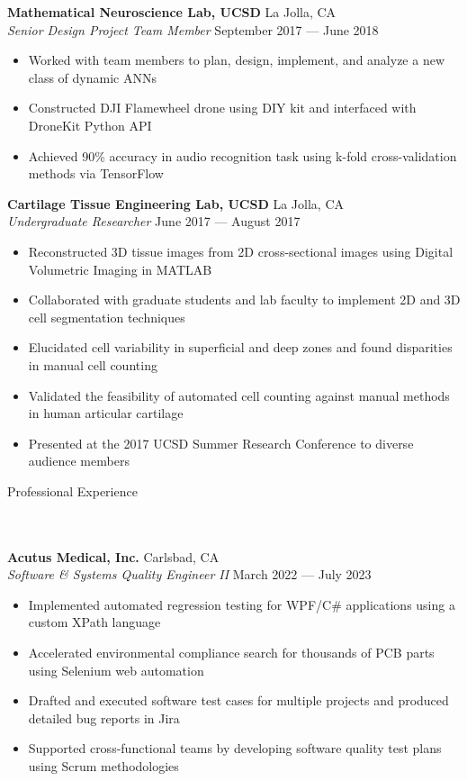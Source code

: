 \documentclass{article}
\newcommand{\lineunder} {
    \vspace*{-8pt} \\
    \hspace*{-18pt} \hrulefill \\
}
\newcommand{\header} [1] {
    {\hspace*{-18pt}\vspace*{6pt} \Large{#1} }
    \vspace*{-6pt} 
    \lineunder
}
\begin{document}
\textbf{Mathematical Neuroscience Lab, UCSD} \hfill La Jolla, CA\\
\textit{Senior Design Project Team Member} \hfill September 2017 --- June 2018\\
\vspace{-2mm}
\begin{itemize} \itemsep 0.05pt
	\item Worked with team members to plan, design, implement, and analyze a new class of dynamic ANNs
	\item Constructed DJI Flamewheel drone using DIY kit and interfaced with DroneKit Python API
	\item Achieved 90\% accuracy in audio recognition task using k-fold cross-validation methods via TensorFlow
	
\end{itemize}

\textbf{Cartilage Tissue Engineering Lab, UCSD} \hfill La Jolla, CA\\
\textit{Undergraduate Researcher} \hfill June 2017 --- August 2017\\
\vspace{-2mm}
\begin{itemize} \itemsep 0.05pt
	\item Reconstructed 3D tissue images from 2D cross-sectional images using Digital Volumetric Imaging in MATLAB
	\item Collaborated with graduate students and lab faculty to implement 2D and 3D cell segmentation techniques
	\item Elucidated cell variability in superficial and deep zones and found disparities in manual cell counting
	\item Validated the feasibility of automated cell counting against manual methods in human articular cartilage
	\item Presented at the 2017 UCSD Summer Research Conference to diverse audience members
\end{itemize}

\header{Professional Experience}

\textbf{Acutus Medical, Inc.} \hfill Carlsbad, CA\\
\textit{Software \& Systems Quality Engineer II} \hfill March 2022 --- July 2023\\
\vspace{-2mm}
\begin{itemize} \itemsep 0.05pt
	\item Implemented automated regression testing for WPF/C\# applications using a custom XPath language
	\item Accelerated environmental compliance search for thousands of PCB parts using Selenium web automation
	\item Drafted and executed software test cases for multiple projects and produced detailed bug reports in Jira
	\item Supported cross-functional teams by developing software quality test plans using Scrum methodologies
\end{itemize}
\end{document}
